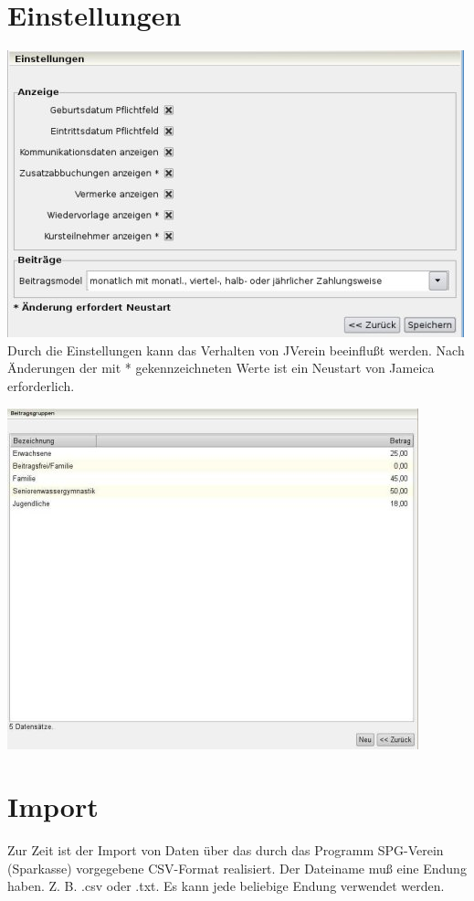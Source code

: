 \documentclass[a4paper,BCOR30mm,DIV14,pdftex,liststotoc,footsepline,openany]{scrbook}
\begin{document}
\section{Einstellungen}
\label{einstellungen}
\includegraphics{./screenshots/einstellungen.jpg}\\
Durch die Einstellungen kann das Verhalten von JVerein beeinflußt werden. Nach Änderungen der mit * gekennzeichneten Werte
ist ein Neustart von Jameica erforderlich.

\includegraphics{./screenshots/beitragsgruppen.jpg}\\

\section{Import}
Zur Zeit ist der Import von Daten über das durch das Programm SPG-Verein (Sparkasse) vorgegebene CSV-Format realisiert. Der Dateiname muß eine Endung haben. Z. B. .csv oder .txt. Es kann jede beliebige Endung verwendet werden.
\end{document}
